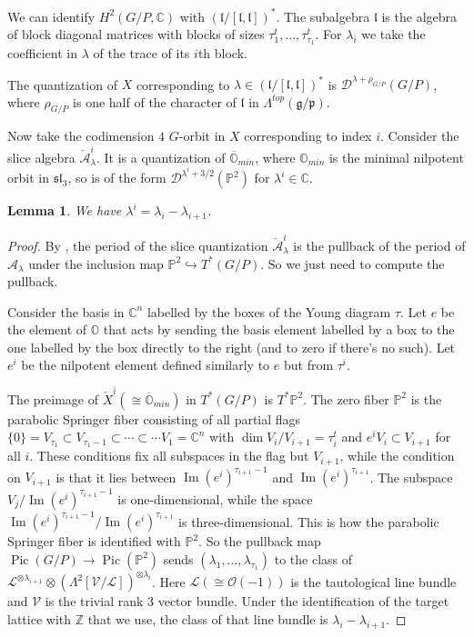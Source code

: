 \documentclass[12pt]{amsart}
\newcommand{\C}{\mathbb{C}}
\newcommand{\A}{\mathcal{A}}
\newcommand{\g}{\mathfrak{g}}
\newcommand{\Orb}{\mathbb{O}}
\newcommand{\Z}{\mathbb{Z}}
\newtheorem{Lem}[Thm]{Lemma}
\theoremstyle{definition}
\numberwithin{equation}{section}
\begin{document}
We can identify
$H^2(G/P,\C)$ with $(\mathfrak{l}/[\mathfrak{l},\mathfrak{l}])^*$.
The subalgebra $\mathfrak{l}$ is the algebra of block diagonal matrices
with blocks of sizes $\tau^t_1,\ldots, \tau^t_{\tau_1}$.
For $\lambda_i$ we take the coefficient in $\lambda$ of the trace of its $i$th block.

The quantization of $X$ corresponding to $\lambda\in (\mathfrak{l}/[\mathfrak{l},\mathfrak{l}])^*$
is $\mathscr{D}^{\lambda+\rho_{G/P}}(G/P)$, where $\rho_{G/P}$ is one half of the character of $\mathfrak{l}$
in $\Lambda^{top}(\g/\mathfrak{p})$.

Now take the codimension $4$ $G$-orbit in $X$ corresponding
to index $i$.
Consider the slice algebra $\check{\A}^i_\lambda$. It is a quantization of $\overline{\Orb}_{min}$,
where $\Orb_{min}$ is the minimal nilpotent orbit in $\mathfrak{sl}_3$, so is of the form
$\mathscr{D}^{\lambda^i+3/2}(\mathbb{P}^2)$ for $\lambda^i\in \C$.

\begin{Lem}\label{Lem:param_corresp_A}
We have $\lambda^i=\lambda_{i}-\lambda_{i+1}$.
\end{Lem}
\begin{proof}
By \cite[Lemma 3.3]{Perv}, the period of the slice quantization $\check{\A}^i_\lambda$
is the pullback of the period of $\A_\lambda$ under the inclusion map $\mathbb{P}^2
\hookrightarrow T^*(G/P)$. So we just need to compute the pullback.

Consider the basis in $\C^n$ labelled by the boxes of the Young diagram $\tau$.
Let $e$ be the element of $\Orb$ that acts by sending the basis element labelled by a
box to the one labelled
by the box directly to the right (and to zero if there's no such).
Let $e^i$ be the nilpotent element defined similarly
to $e$ but from $\tau^i$.

The preimage of $\check{X}^i(\cong \overline{\Orb}_{min})$ in $T^*(G/P)$ is $T^*\mathbb{P}^2$.
The zero fiber $\mathbb{P}^2$ is the parabolic Springer fiber consisting of all
partial flags $\{0\}=V_{\tau_1}\subset V_{\tau_1-1}\subset\cdots \subset\cdots V_{1}=\C^n$ with
$\dim V_i/V_{i+1}=\tau^t_i$ and $e^i V_i\subset V_{i+1}$ for all $i$. These conditions
fix all subspaces in the flag but $V_{i+1}$, while the condition on $V_{i+1}$ is that
it lies between $\operatorname{Im}(e^i)^{\tau_{i+1}-1}$ and $\operatorname{Im}(e^i)^{\tau_{i+1}}$.
The subspace       $V_j/\operatorname{Im}(e^i)^{\tau_{i+1}-1}$ is one-dimensional,
while the space $\operatorname{Im}(e^i)^{\tau_{i+1}-1}/\operatorname{Im}(e^i)^{\tau_{i+1}}$
is three-dimensional. This is how the parabolic Springer fiber is identified with
$\mathbb{P}^2$. So the pullback map $\operatorname{Pic}(G/P)\rightarrow
\operatorname{Pic}(\mathbb{P}^2)$ sends $(\lambda_1,\ldots,\lambda_{\tau_1})$
to the class of $\mathcal{L}^{\otimes \lambda_{i+1}}\otimes (\Lambda^2[\mathcal{V}/\mathcal{L}])^{\otimes \lambda_{i}}$. Here $\mathcal{L}(\cong \mathcal{O}(-1))$ is the tautological line bundle
and $\mathcal{V}$ is the trivial rank 3 vector bundle. Under the identification of the target lattice
with $\Z$ that we use, the class of that line bundle is
$\lambda_{i}-\lambda_{i+1}$.
\end{proof}
\end{document}
